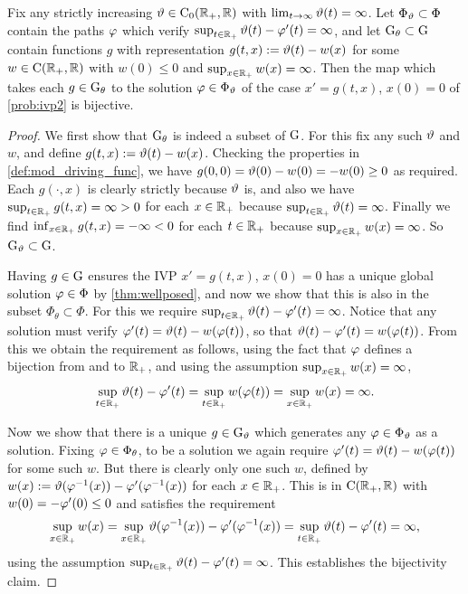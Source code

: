 \begin{theorem}\label{thm:solutionmap}
    Fix any strictly increasing $\vartheta\in\mathrm{C}_0(\mathbb{R}_+,\mathbb{R})$ with $\lim_{t\to\infty}\vartheta(t)=\infty$. Let $\Phi_\vartheta\subset\Phi$ contain the paths $\varphi$ which verify $\sup_{t\in\mathbb{R}_+}\vartheta(t)-\varphi'(t)=\infty$, and let $\mathrm{G}_\theta\subset\mathrm{G}$ contain functions $g$ with representation $g(t,x):=\vartheta(t)-w(x)$ for some $w\in\mathrm{C}(\mathbb{R}_+,\mathbb{R})$ with $w(0)\le0$ and $\sup_{x\in\mathbb{R}_+}w(x)=\infty$. Then the map which takes each $g\in\mathrm{G}_\theta$ to the solution $\varphi\in\Phi_\vartheta$ of the case $x' = g(t,x)$, $x(0)=0$ of \autoref{prob:ivp2} is bijective.
\end{theorem}
\begin{proof}
    We first show that $\mathrm{G}_\theta$ is indeed a subset of $\mathrm{G}$. For this fix any such $\vartheta$ and $w$, and define $g(t,x):=\vartheta(t)-w(x)$. Checking the properties in \autoref{def:mod_driving_func}, we have $g(0,0) = \vartheta(0) - w(0)=-w(0)\ge0$ as required. Each $g(\cdot,x)$ is clearly strictly because $\vartheta$ is, and also we have $\sup_{t\in\mathbb{R}_+}g(t,x) =\infty >0$ for each $x\in\mathbb{R}_+$ because $\sup_{t\in\mathbb{R}_+}\vartheta(t) =\infty$. Finally we find $\inf_{x\in\mathbb{R}_+}g(t,x)=-\infty<0$ for each $t\in\mathbb{R}_+$ because $\sup_{x\in\mathbb{R}_+}w(x)=\infty$. So $\mathrm{G}_\vartheta\subset\mathrm{G}$.

    Having $g\in\mathrm{G}$ ensures the IVP $x'=g(t,x)$, $x(0)=0$ has a unique global solution $\varphi\in\Phi$ by \autoref{thm:wellposed}, and now we show that this is also in the subset $\Phi_\theta\subset\Phi$. For this we require $\sup_{t\in\mathbb{R}_+}\vartheta(t)-\varphi'(t)=\infty$. Notice that any solution must verify $\varphi'(t)=\vartheta(t)-w(\varphi(t))$, so that $\vartheta(t)-\varphi'(t) = w(\varphi(t))$. From this we obtain the requirement as follows, using the fact that $\varphi$ defines a bijection from and to $\mathbb{R}_+$, and using the assumption $\sup_{x\in\mathbb{R}_+}w(x)=\infty$,
    \begin{equation}
        \sup_{t\in\mathbb{R}_+}\vartheta(t)-\varphi'(t) = \sup_{t\in\mathbb{R}_+}w(\varphi(t)) =
        \sup_{x\in\mathbb{R}_+}w(x) = \infty.
    \end{equation}

    Now we show that there is a unique $g\in\mathrm{G}_\vartheta$ which generates any $\varphi\in\Phi_\vartheta$ as a solution. Fixing $\varphi\in\Phi_\theta$, to be a solution we again require $\varphi'(t)=\vartheta(t)-w(\varphi(t))$ for some such $w$. But there is clearly only one such $w$, defined by $w(x):=\vartheta(\varphi^{-1}(x)) - \varphi'(\varphi^{-1}(x))$ for each $x\in\mathbb{R}_+$. This is in $\mathrm{C}(\mathbb{R}_+,\mathbb{R})$ with $w(0)=-\varphi'(0)\le0$ and satisfies the requirement
    \begin{equation}
        \sup_{x\in\mathbb{R}_+}w(x) = \sup_{x\in\mathbb{R}_+}\vartheta(\varphi^{-1}(x)) - \varphi'(\varphi^{-1}(x)) = \sup_{t\in\mathbb{R}_+}\vartheta(t)-\varphi'(t)=\infty,
    \end{equation}
    using the assumption $\sup_{t\in\mathbb{R}_+}\vartheta(t)-\varphi'(t)=\infty$. This establishes the bijectivity claim.
\end{proof}

